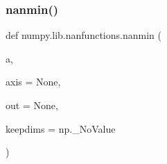  \mbox{\label{namespacenumpy_1_1lib_1_1nanfunctions_a8e2e3d5692a3b58cd6a1ec33af0789e0}} 
\subsubsection{\texorpdfstring{nanmin()}{nanmin()}}
{\footnotesize\ttfamily def numpy.\+lib.\+nanfunctions.\+nanmin (\begin{DoxyParamCaption}\item[{}]{a,  }\item[{}]{axis = {\ttfamily None},  }\item[{}]{out = {\ttfamily None},  }\item[{}]{keepdims = {\ttfamily np.\+\_\+NoValue} }\end{DoxyParamCaption})}

